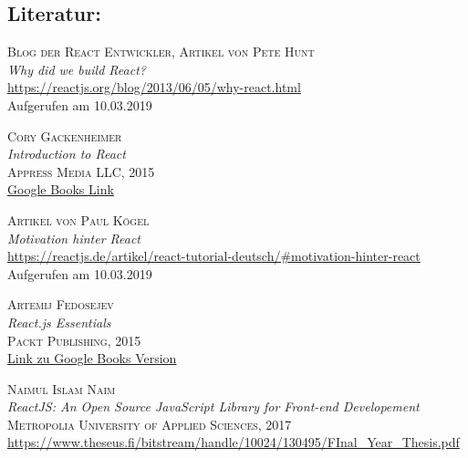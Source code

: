 \documentclass[twoside,12pt,a4paper]{report}
\begin{document}

\begin{thebibliography}{9}
  \section*{Literatur:}

  \textsc{Blog der React Entwickler, Artikel von Pete Hunt}\\
  \textit{Why did we build React?}\\
  \href{https://reactjs.org/blog/2013/06/05/why-react.html}{https://reactjs.org/blog/2013/06/05/why-react.html}\\
  Aufgerufen am 10.03.2019

  \textsc{Cory Gackenheimer}\\
  \textit{Introduction to React}\\
  \textsc{Appress Media LLC, 2015}\\
  \href{https://books.google.de/books?hl=de&lr=&id=NZCKCgAAQBAJ&oi=fnd&pg=PR6&dq=react+javascript&ots=KAvyPmyx-e&sig=vmxw0RuGUAADmEc_vZTL4VakTnE#v=onepage&q=react%20javascript&f=false}{Google Books Link}

  \textsc{Artikel von Paul Kögel}\\
  \textit{Motivation hinter React}\\
  \href{https://reactjs.de/artikel/react-tutorial-deutsch/#motivation-hinter-react}{https://reactjs.de/artikel/react-tutorial-deutsch/\#motivation-hinter-react}\\
  Aufgerufen am 10.03.2019

  \textsc{Artemij Fedosejev}\\
  \textit{React.js Essentials}\\
  \textsc{Packt Publishing, 2015}\\
  \href{https://books.google.de/books?hl=de&lr=&id=Rhl1CgAAQBAJ&oi=fnd&pg=PP1&dq=react+javascript&ots=JjvymzwSMG&sig=V3PsDnRjBuwxrtUaRyrYVkB6Ffk#v=onepage&q=react%20javascript&f=false}{Link zu Google Books Version}

  \textsc{Naimul Islam Naim}\\
  \textit{ReactJS:  An  Open  Source  JavaScript  Library for Front-end Developement}\\
  \textsc{Metropolia University of Applied Sciences, 2017}\\
  \href{https://www.theseus.fi/bitstream/handle/10024/130495/FInal_Year_Thesis.pdf}{https://www.theseus.fi/bitstream/handle/10024/130495/FInal\_Year\_Thesis.pdf}


\end{thebibliography}
\end{document}
